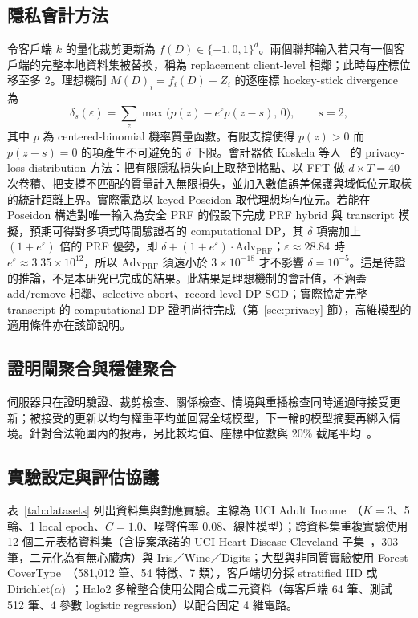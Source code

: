 \documentclass[12pt,a4paper]{article}
\newcommand{\eps}{\varepsilon}
\begin{document}
\subsection{隱私會計方法}
\label{sec:privacy-method}
令客戶端 $k$ 的量化裁剪更新為 $f(D)\in\{-1,0,1\}^d$。兩個聯邦輸入若只有一個客戶端的完整本地資料集被替換，稱為 replacement client-level 相鄰；此時每座標位移至多 $2$。理想機制 $M(D)_i=f_i(D)+Z_i$ 的逐座標 hockey-stick divergence 為
\begin{equation}
\delta_s(\eps)=\sum_z\max\bigl(p(z)-e^{\eps}p(z-s),\,0\bigr),\qquad s=2,
\end{equation}
其中 $p$ 為 centered-binomial 機率質量函數。有限支撐使得 $p(z)>0$ 而 $p(z-s)=0$ 的項產生不可避免的 $\delta$ 下限。會計器依 Koskela 等人~\cite{koskela2021tight} 的 privacy-loss-distribution 方法：把有限隱私損失向上取整到格點、以 FFT 做 $d\times T=40$ 次卷積、把支撐不匹配的質量計入無限損失，並加入數值誤差保護與域低位元取樣的統計距離上界。實際電路以 keyed Poseidon 取代理想均勻位元。若能在 Poseidon 構造對唯一輸入為安全 PRF 的假設下完成 PRF hybrid 與 transcript 模擬，預期可得對多項式時間驗證者的 computational DP，其 $\delta$ 項需加上 $(1+e^{\eps})$ 倍的 PRF 優勢，即 $\delta+(1+e^{\eps})\cdot\mathrm{Adv}_{\mathrm{PRF}}$；$\eps\approx28.84$ 時 $e^{\eps}\approx3.35\times10^{12}$，所以 $\mathrm{Adv}_{\mathrm{PRF}}$ 須遠小於 $3\times10^{-18}$ 才不影響 $\delta=10^{-5}$。這是待證的推論，不是本研究已完成的結果。此結果是理想機制的會計值，不涵蓋 add/remove 相鄰、selective abort、record-level DP-SGD；實際協定完整 transcript 的 computational-DP 證明尚待完成（第~\ref{sec:privacy} 節），高維模型的適用條件亦在該節說明。

\subsection{證明閘聚合與穩健聚合}
伺服器只在證明驗證、裁剪檢查、關係檢查、情境與重播檢查同時通過時接受更新；被接受的更新以均勻權重平均並回寫全域模型，下一輪的模型摘要再綁入情境。針對合法範圍內的投毒，另比較均值、座標中位數與 20\% 截尾平均~\cite{yin2018byzantine}。

\subsection{實驗設定與評估協議}
\label{sec:setup}
表~\ref{tab:datasets} 列出資料集與對應實驗。主線為 UCI Adult Income~\cite{kohavi1996adult}（$K=3$、5 輪、1 local epoch、$C=1.0$、噪聲倍率 0.08、線性模型）；跨資料集重複實驗使用 12 個二元表格資料集（含提案承諾的 UCI Heart Disease Cleveland 子集~\cite{janosi1988heart}，303 筆，二元化為有無心臟病）與 Iris／Wine／Digits；大型與非同質實驗使用 Forest CoverType~\cite{blackard1999covertype}（581,012 筆、54 特徵、7 類），客戶端切分採 stratified IID 或 Dirichlet($\alpha$)~\cite{hsu2019noniid}；Halo2 多輪整合使用公開合成二元資料（每客戶端 64 筆、測試 512 筆、4 參數 logistic regression）以配合固定 4 維電路。
\end{document}

